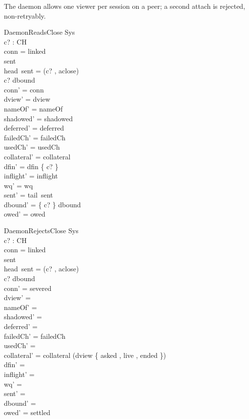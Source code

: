 \documentclass[a4paper,10pt,fleqn]{article}
\begin{document}
The daemon allows one viewer per session on a peer; a second attach is rejected, non-retryably.

\begin{schema}{DaemonReadsClose}
  \Delta Sys \\
  c? : CH \\
\where
  conn = linked \\
  sent \neq \langle \rangle \\
  head~sent = (c? , aclose) \\
  c? \in \dom dbound \\
  conn' = conn \\
  dview' = dview \\
  nameOf' = nameOf \\
  shadowed' = shadowed \\
  deferred' = deferred \\
  failedCh' = failedCh \\
  usedCh' = usedCh \\
  collateral' = collateral \\
  dfin' = dfin \setminus \{ c? \} \\
  inflight' = inflight \\
  wq' = wq \\
  sent' = tail~sent \\
  dbound' = \{ c? \} \ndres dbound \\
  owed' = owed
\end{schema}

\begin{schema}{DaemonRejectsClose}
  \Delta Sys \\
  c? : CH \\
\where
  conn = linked \\
  sent \neq \langle \rangle \\
  head~sent = (c? , aclose) \\
  c? \notin \dom dbound \\
  conn' = severed \\
  dview' = \emptyset \\
  nameOf' = \emptyset \\
  shadowed' = \emptyset \\
  deferred' = \emptyset \\
  failedCh' = failedCh \\
  usedCh' = \emptyset \\
  collateral' = collateral \cup \dom (dview \rres \{ asked , live , ended \}) \\
  dfin' = \emptyset \\
  inflight' = \langle \rangle \\
  wq' = \langle \rangle \\
  sent' = \langle \rangle \\
  dbound' = \emptyset \\
  owed' = settled
\end{schema}
\end{document}
